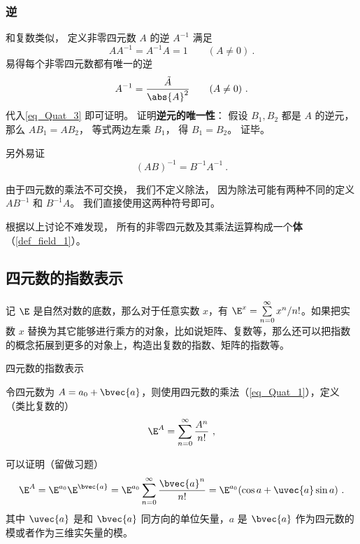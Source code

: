 \subsubsection{逆}
和复数类似， 定义非零四元数 $A$ 的逆 $A^{-1}$ 满足
\begin{equation}\label{eq_Quat_3}
AA^{-1} = A^{-1}A = 1 \qquad (A \ne 0)~.
\end{equation}
易得每个非零四元数都有唯一的逆
\begin{equation}\label{eq_Quat_4}
A^{-1} = \frac{\tilde A}{\abs{A}^2} \qquad (A \ne 0)~.
\end{equation}
代入\autoref{eq_Quat_3} 即可证明。 证明\textbf{逆元的唯一性}： 假设 $B_1, B_2$ 都是 $A$ 的逆元， 那么 $AB_1 = AB_2$， 等式两边左乘 $B_1$， 得 $B_1 = B_2$。 证毕。

另外易证
\begin{equation}
(AB)^{-1} = B^{-1}A^{-1}~.
\end{equation}

由于四元数的乘法不可交换， 我们不定义除法， 因为除法可能有两种不同的定义 $AB^{-1}$ 和 $B^{-1}A$。 我们直接使用这两种符号即可。

根据以上讨论不难发现， 所有的非零四元数及其乘法运算构成一个\textbf{体}（\autoref{def_field_1}）。





\subsection{四元数的指数表示}

记 $\E$ 是自然对数的底数，那么对于任意实数 $x$，有 $\E^x = \sum^\infty\limits_{n=0} x^n / n!$。如果把实数 $x$ 替换为其它能够进行乘方的对象，比如说矩阵、复数等，那么还可以把指数的概念拓展到更多的对象上，构造出复数的指数、矩阵的指数等。

\begin{definition}{四元数的指数表示}

令四元数为 $A=a_0+\bvec{a}$，则使用四元数的乘法（\autoref{eq_Quat_1}），定义（类比复数的）
\begin{equation}\label{eq_Quat_2}
\E^A = \sum^\infty\limits_{n=0}\frac{A^n}{n!}~,
\end{equation}
\end{definition}
可以证明（留做习题）
\begin{equation}
\E^A = \E^{a_0}\E^{\bvec{a}}=\E^{a_0}\sum^\infty\limits_{n=0}\frac{\bvec{a}^n}{n!}=\E^{a_0}(\cos{a}+ \uvec{a}\sin a)~.
\end{equation}
其中 $\uvec{a}$ 是和 $\bvec{a}$ 同方向的单位矢量，$a$ 是 $\bvec{a}$ 作为四元数的模或者作为三维实矢量的模。


